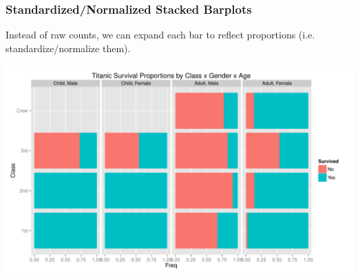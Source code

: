 \documentclass[handout]{beamer}
\begin{document}
\begin{frame}[fragile]
\frametitle{Standardized/Normalized Stacked Barplots}
Instead of raw counts, we can expand each bar to reflect proportions (i.e. standardize/normalize them). 

\begin{center}
\includegraphics[width=\textwidth]{figure/titanic2.pdf}
\end{center}


\end{frame}
\end{document}
